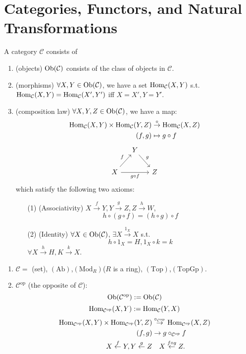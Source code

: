\section{Categories, Functors, and Natural Transformations}
\begin{definition}[categories]
   A category $\mathcal{C}$ consists of 
   \begin{enumerate}
     \item (objects) $\operatorname{Ob}(\mathcal{C})$ consists of the class of objects in $\mathcal{C}$.
     \item (morphisms) $\forall X,Y \in  \operatorname{Ob}(\mathcal{C)}$, we have a set 
       $\operatorname{Hom}_{\mathcal{C}}(X,Y)$ s.t. $\operatorname{Hom}_{\mathcal{C}}(X,Y)=\operatorname{Hom}_{\mathcal{C}}(X',Y')$ iff $X=X',Y=Y'$.
     \item (composition law)  $\forall X,Y,Z \in \operatorname{Ob}(\mathcal{C})$, we have a map:
       \begin{align*}
	\operatorname{Hom}_{\mathcal{C}}(X,Y)\times \operatorname{Hom}_{\mathcal{C}}(Y,Z)&\overset{\circ}{\to}\operatorname{Hom}_{\mathcal{C}}(X,Z)\\
	(f,g)&\mapsto  g\circ f
	     \end{align*}
	     \[
	       \begin{tikzcd}[column sep = small]
	       &  Y\arrow{rd}{g} & \\
	       X\arrow{ru}{f} \arrow[swap]{rr}{g\circ f} & & Z
	     \end{tikzcd}
	     \]
	     which satisfy the following two axioms:
	     \begin{itemize}
	       \item [(1)](Associativity) $X\overset{f}{\to}Y,Y\overset{g}{\to}Z,Z\overset{h}{\to}W$,
		  \[
		    h\circ(g\circ f)=(h\circ g)\circ f
		 \] 
	       \item [(2)](Identity) $\forall X\in \operatorname{Ob}(\mathcal{C})$, $\exists X\overset{1_X}{\to}X$ s.t. 
		  \[
		 h\circ 1_X=H, 1_X\circ k=k
		 \] 
		$\forall X\overset{h}{\to}H,K\overset{k}{\to}X$.
		 
	     \end{itemize}
   \end{enumerate}
 \end{definition}
 \begin{example}
\begin{enumerate}
  \item 
   $\mathcal{C}=$ (set), $(\text{Ab})$,$(\text{Mod}_R)$($R$ is a ring), $(\text{Top})$,$(\text{TopGp})$.
 \item $\mathcal{C}^{\text{op}}$ (the opposite of $\mathcal{C}$):
   \[
     \operatorname{Ob}(\mathcal{C}^{\text{op}}):=\operatorname{Ob}(\mathcal{C})
   \] 
   \[
     \operatorname{Hom}_{\mathcal{C}^{\text{op}}}(X,Y):=\operatorname{Hom}_{\mathcal{C}}(Y,X)
   \] 
   \begin{align*}
     \operatorname{Hom}_{\mathcal{C}^{\text{op}}}(X,Y)\times \operatorname{Hom}_{\mathcal{C}^{\text{op}}}(Y,Z)&\overset{\circ_{\mathcal{C}^{\text{op}}}}{\to}\operatorname{Hom}_{\mathcal{C}^{\text{op}}}(X,Z)\\
     (f,g)&\to g\circ_{\mathcal{C}^{\text{op}}} f\\
     X\overset{f}{\gets}Y,Y\overset{g}{\gets}Z &\quad X\overset{f\circ g}{\gets}Z
   .\end{align*}
   
\end{enumerate}
 \end{example}

